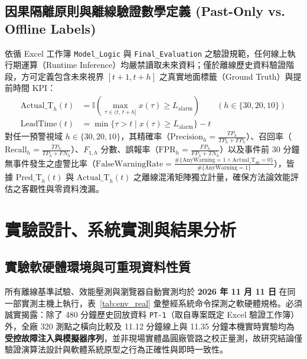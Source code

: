 \documentclass[fontset=none, a4paper, 12pt]{ctexart}
\begin{document}
\begin{doublespace}
\subsection{因果隔離原則與離線驗證數學定義 (Past-Only vs. Offline Labels)}
依循 Excel 工作簿 \texttt{Model\_Logic} 與 \texttt{Final\_Evaluation} 之驗證規範，任何線上執行期運算（Runtime Inference）均嚴禁讀取未來資料；僅於離線歷史資料驗證階段，方可定義包含未來視界 $[t+1, t+h]$ 之真實地面標籤（Ground Truth）與提前時間 KPI：
\begin{align}
\mathrm{Actual\_T}_h(t) &= \mathbb{I}\!\left(\max_{\tau \in (t,\, t+h]} x(\tau) \ge L_{\mathrm{alarm}}\right) \qquad (h\in\{30,20,10\}) \nonumber \\
\mathrm{LeadTime}(t) &= \min\{\tau > t \mid x(\tau) \ge L_{\mathrm{alarm}}\} - t
\label{eq:offline_eval}
\end{align}
對任一預警視域 $h \in \{30, 20, 10\}$，其精確率（$\mathrm{Precision}_h = \frac{TP_h}{TP_h+FP_h}$）、召回率（$\mathrm{Recall}_h = \frac{TP_h}{TP_h+FN_h}$）、$F_{1,h}$ 分數、誤報率（$\mathrm{FPR}_h = \frac{FP_h}{FP_h+TN_h}$）以及事件前 30 分鐘無事件發生之虛警比率（$\mathrm{FalseWarningRate} = \frac{\#\{\mathrm{AnyWarning}=1 \land \mathrm{Actual\_T}_{30}=0\}}{\#\{\mathrm{AnyWarning}=1\}}$），皆據 $\mathrm{Pred\_T}_h(t)$ 與 $\mathrm{Actual\_T}_h(t)$ 之離線混淆矩陣獨立計量，確保方法論效能評估之客觀性與零資料洩漏。

\clearpage
\section{實驗設計、系統實測與結果分析}

\subsection{實驗軟硬體環境與可重現資料性質}
所有離線基準試驗、效能壓測與瀏覽器自動實測均於 \textbf{2026 年 11 月 11 日} 在同一部實測主機上執行，表~\ref{tab:env_real} 彙整經系統命令探測之軟硬體規格。必須誠實揭露：除了 480 分鐘歷史回放資料 \texttt{PT-1}（取自專案既定 Excel 驗證工作簿）外，全廠 320 測點之橫向比較及 11.12 分鐘線上與 11.35 分鐘本機實時實驗均為\textbf{受控故障注入與模擬器序列}，並非現場實體晶圓廠管路之校正量測，故研究結論僅驗證演算法設計與軟體系統原型之行為正確性與即時一致性。


\end{doublespace}
\end{document}
